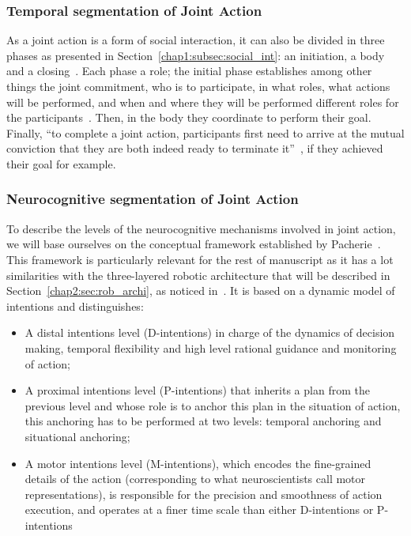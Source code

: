\documentclass[a4paper,11pt,twoside]{StyleThese}
\begin{document}
\subsubsection{Temporal segmentation of Joint Action}
As a joint action is a form of social interaction, it can also be divided in three phases as presented in Section~\ref{chap1:subsec:social_int}: an initiation, a body and a closing~\cite{heesen_2017_social}. Each phase a role; the initial phase establishes among other things the joint commitment, \ie who is to participate, in what roles, what actions will be performed, and when and where they will be performed different roles for the participants~\cite{clark_2006_social}. Then, in the body they coordinate to perform their goal. Finally, ``to complete a joint action, participants first need to arrive at the mutual conviction that they are both indeed ready to terminate it''~\cite{heesen_2017_social}, if they achieved their goal for example.

\subsubsection{Neurocognitive segmentation of Joint Action}

To describe the levels of the neurocognitive mechanisms involved in joint action, we will base ourselves on the conceptual framework established by Pacherie~\cite{pacherie_2008_phenomenology}. This framework is particularly relevant for the rest of manuscript as it has a lot similarities with the three-layered robotic architecture that will be described in Section~\ref{chap2:sec:rob_archi}, as noticed in~\cite{clodic_2017_key}. It is based on a dynamic model of intentions and distinguishes:

\begin{itemize}
	\item A distal intentions level (D-intentions) in charge of the dynamics of decision making, temporal flexibility and high level rational guidance and monitoring of action;
	\item A proximal intentions level (P-intentions) that inherits a plan from the previous level and whose role is to anchor this plan in the situation of action, this anchoring has to be performed at two levels: temporal anchoring and situational anchoring;
	\item A motor intentions level (M-intentions), which encodes the fine-grained details of the action (corresponding to what neuroscientists call motor representations), is responsible for the precision and smoothness of action execution, and operates at a finer time scale than either D-intentions or P-intentions
\end{itemize}
\end{document}
